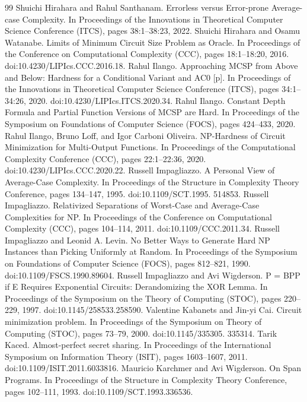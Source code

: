 \documentclass[10pt,a4paper]{article}
\begin{document}
\begin{thebibliography}{99}
 Shuichi Hirahara and Rahul Santhanam. Errorless versus Error-prone Average-case Complexity. In Proceedings of the Innovations in Theoretical Computer Science Conference (ITCS), pages 38:1–38:23, 2022.
 Shuichi Hirahara and Osamu Watanabe. Limits of Minimum Circuit Size Problem as Oracle. In Proceedings of the Conference on Computational Complexity (CCC), pages 18:1–18:20, 2016. doi:10.4230/LIPIcs.CCC.2016.18.
 Rahul Ilango. Approaching MCSP from Above and Below: Hardness for a Conditional Variant and AC0 [p]. In Proceedings of the Innovations in Theoretical Computer Science Conference (ITCS), pages 34:1–34:26, 2020. doi:10.4230/LIPIcs.ITCS.2020.34.
 Rahul Ilango. Constant Depth Formula and Partial Function Versions of MCSP are Hard. In Proceedings of the Symposium on Foundations of Computer Science (FOCS), pages 424–433, 2020.
 Rahul Ilango, Bruno Loff, and Igor Carboni Oliveira. NP-Hardness of Circuit Minimization for Multi-Output Functions. In Proceedings of the Computational Complexity Conference (CCC), pages 22:1–22:36, 2020. doi:10.4230/LIPIcs.CCC.2020.22.
 Russell Impagliazzo. A Personal View of Average-Case Complexity. In Proceedings of the Structure in Complexity Theory Conference, pages 134–147, 1995. doi:10.1109/SCT.1995. 514853.
 Russell Impagliazzo. Relativized Separations of Worst-Case and Average-Case Complexities for NP. In Proceedings of the Conference on Computational Complexity (CCC), pages 104–114, 2011. doi:10.1109/CCC.2011.34.
 Russell Impagliazzo and Leonid A. Levin. No Better Ways to Generate Hard NP Instances than Picking Uniformly at Random. In Proceedings of the Symposium on Foundations of Computer Science (FOCS), pages 812–821, 1990. doi:10.1109/FSCS.1990.89604.
 Russell Impagliazzo and Avi Wigderson. P = BPP if E Requires Exponential Circuits: Derandomizing the XOR Lemma. In Proceedings of the Symposium on the Theory of Computing (STOC), pages 220–229, 1997. doi:10.1145/258533.258590.
 Valentine Kabanets and Jin-yi Cai. Circuit minimization problem. In Proceedings of the Symposium on Theory of Computing (STOC), pages 73–79, 2000. doi:10.1145/335305. 335314.
 Tarik Kaced. Almost-perfect secret sharing. In Proceedings of the International Symposium on Information Theory (ISIT), pages 1603–1607, 2011. doi:10.1109/ISIT.2011.6033816.
 Mauricio Karchmer and Avi Wigderson. On Span Programs. In Proceedings of the Structure in Complexity Theory Conference, pages 102–111, 1993. doi:10.1109/SCT.1993.336536.

\end{thebibliography}
\end{document}
